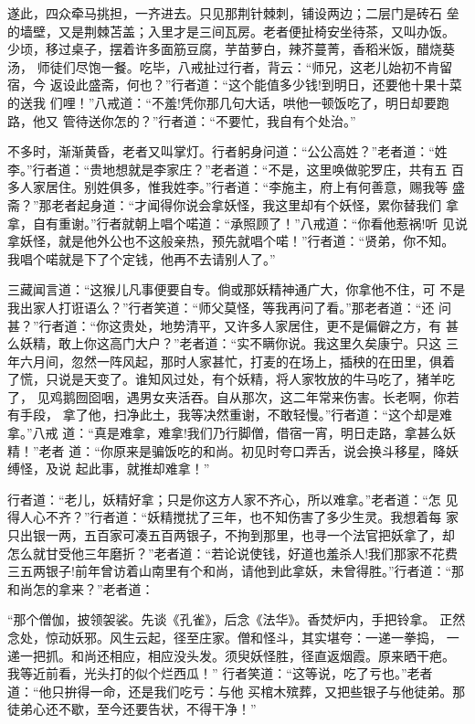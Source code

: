 遂此，四众牵马挑担，一齐进去。只见那荆针棘刺，铺设两边；二层门是砖石
垒的墙壁，又是荆棘苫盖；入里才是三间瓦房。老者便扯椅安坐待茶，又叫办饭。
少顷，移过桌子，摆着许多面筋豆腐，芋苗萝白，辣芥蔓菁，香稻米饭，醋烧葵汤，
师徒们尽饱一餐。吃毕，八戒扯过行者，背云：“师兄，这老儿始初不肯留宿，今
返设此盛斋，何也？”行者道：“这个能值多少钱!到明日，还要他十果十菜的送我
们哩！”八戒道：“不羞!凭你那几句大话，哄他一顿饭吃了，明日却要跑路，他又
管待送你怎的？”行者道：“不要忙，我自有个处治。”

不多时，渐渐黄昏，老者又叫掌灯。行者躬身问道：“公公高姓？”老者道：“姓
李。”行者道：“贵地想就是李家庄？”老者道：“不是，这里唤做驼罗庄，共有五
百多人家居住。别姓俱多，惟我姓李。”行者道：“李施主，府上有何善意，赐我等
盛斋？”那老者起身道：“才闻得你说会拿妖怪，我这里却有个妖怪，累你替我们
拿拿，自有重谢。”行者就朝上唱个喏道：“承照顾了！”八戒道：“你看他惹祸!听
见说拿妖怪，就是他外公也不这般亲热，预先就唱个喏！”行者道：“贤弟，你不知。
我唱个喏就是下了个定钱，他再不去请别人了。”

三藏闻言道：“这猴儿凡事便要自专。倘或那妖精神通广大，你拿他不住，可
不是我出家人打诳语么？”行者笑道：“师父莫怪，等我再问了看。”那老者道：“还
问甚？”行者道：“你这贵处，地势清平，又许多人家居住，更不是偏僻之方，有
甚么妖精，敢上你这高门大户？”老者道：“实不瞒你说。我这里久矣康宁。只这
三年六月间，忽然一阵风起，那时人家甚忙，打麦的在场上，插秧的在田里，俱着
了慌，只说是天变了。谁知风过处，有个妖精，将人家牧放的牛马吃了，猪羊吃了，
见鸡鹅囫囵咽，遇男女夹活吞。自从那次，这二年常来伤害。长老啊，你若有手段，
拿了他，扫净此土，我等决然重谢，不敢轻慢。”行者道：“这个却是难拿。”八戒
道：“真是难拿，难拿!我们乃行脚僧，借宿一宵，明日走路，拿甚么妖精！”老者
道：“你原来是骗饭吃的和尚。初见时夸口弄舌，说会换斗移星，降妖缚怪，及说
起此事，就推却难拿！”

行者道：“老儿，妖精好拿；只是你这方人家不齐心，所以难拿。”老者道：“怎
见得人心不齐？”行者道：“妖精搅扰了三年，也不知伤害了多少生灵。我想着每
家只出银一两，五百家可凑五百两银子，不拘到那里，也寻一个法官把妖拿了，却
怎么就甘受他三年磨折？”老者道：“若论说使钱，好道也羞杀人!我们那家不花费
三五两银子!前年曾访着山南里有个和尚，请他到此拿妖，未曾得胜。”行者道：“那
和尚怎的拿来？”老者道：

“那个僧伽，披领袈裟。先谈《孔雀》，后念《法华》。香焚炉内，手把铃拿。
正然念处，惊动妖邪。风生云起，径至庄家。僧和怪斗，其实堪夸：一递一拳捣，
一递一把抓。和尚还相应，相应没头发。须臾妖怪胜，径直返烟霞。原来晒干疤。
我等近前看，光头打的似个烂西瓜！”
行者笑道：“这等说，吃了亏也。”老者道：“他只拚得一命，还是我们吃亏：与他
买棺木殡葬，又把些银子与他徒弟。那徒弟心还不歇，至今还要告状，不得干净！”

